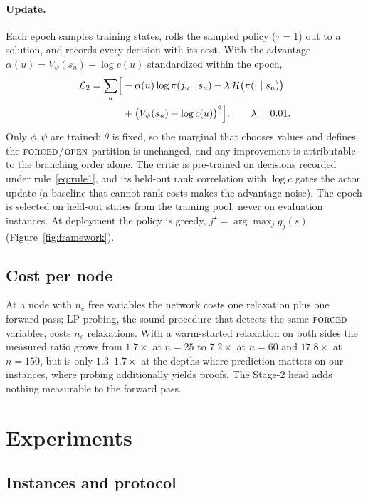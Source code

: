 \documentclass[final,5p,times,twocolumn]{elsarticle}
\newcommand{\FORCED}{\textsc{forced}}
\newcommand{\FREE}{\textsc{open}}
\begin{document}
\paragraph{Update.} Each epoch samples training states, rolls the sampled policy ($\tau=1$) out to a solution, and records every decision with its cost. With the advantage $\alpha(u)=V_\psi(s_u)-\log c(u)$ standardized within the epoch,
\begin{equation}
\begin{split}
\mathcal{L}_2=\sum_u\Bigl[&-\alpha(u)\log\pi(j_u\mid s_u)-\lambda\,\mathcal{H}\bigl(\pi(\cdot\mid s_u)\bigr)\\
&+\bigl(V_\psi(s_u)-\log c(u)\bigr)^2\Bigr],\qquad\lambda=0.01.
\end{split}
\label{eq:loss2}
\end{equation}
Only $\phi,\psi$ are trained; $\theta$ is fixed, so the marginal that chooses values and defines the $\FORCED$/$\FREE$ partition is unchanged, and any improvement is attributable to the branching order alone. The critic is pre-trained on decisions recorded under rule~\eqref{eq:rule1}, and its held-out rank correlation with $\log c$ gates the actor update (a baseline that cannot rank costs makes the advantage noise). The epoch is selected on held-out states from the training pool, never on evaluation instances. At deployment the policy is greedy, $j^\star=\arg\max_j g_j(s)$ (Figure~\ref{fig:framework}).

\subsection{Cost per node}
\label{sec:method-cost}

At a node with $n_c$ free variables the network costs one relaxation plus one forward pass; LP-probing, the sound procedure that detects the same $\FORCED$ variables, costs $n_c$ relaxations. With a warm-started relaxation on both sides the measured ratio grows from $1.7\times$ at $n=25$ to $7.2\times$ at $n=60$ and $17.8\times$ at $n=150$, but is only $1.3$--$1.7\times$ at the depths where prediction matters on our instances, where probing additionally yields proofs. The Stage-2 head adds nothing measurable to the forward pass.

\section{Experiments}
\label{sec:exp}

\subsection{Instances and protocol}
\label{sec:exp-protocol}
\end{document}
